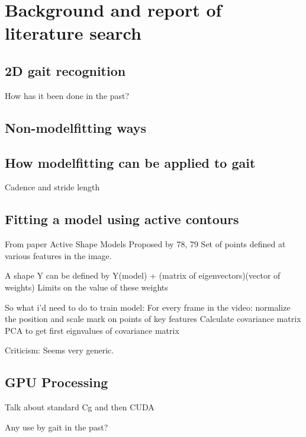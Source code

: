 \section{Background and report of literature search}

\subsection{2D gait recognition}

How has it been done in the past?

\subsection{Non-modelfitting ways}

\subsection{How modelfitting can be applied to gait}

Cadence and stride length \cite{GaitBook}

\subsection{Fitting a model using active contours}

From paper \cite{ImageSegModesl}
Active Shape Models  Proposed by 78, 79
Set of points defined at various features in the image.

A shape Y can be defined by Y(model) + (matrix of eigenvectors)(vector of weights)
Limits on the value of these weights

So what i'd need to do to train model:
For every frame in the video:
  normalize the position and scale
  mark on points of key features
Calculate covariance matrix
PCA to get first eignvalues of covariance matrix

Criticism:
Seems very generic.

\subsection{GPU Processing}

Talk about standard Cg and then CUDA

Any use by gait in the past?
